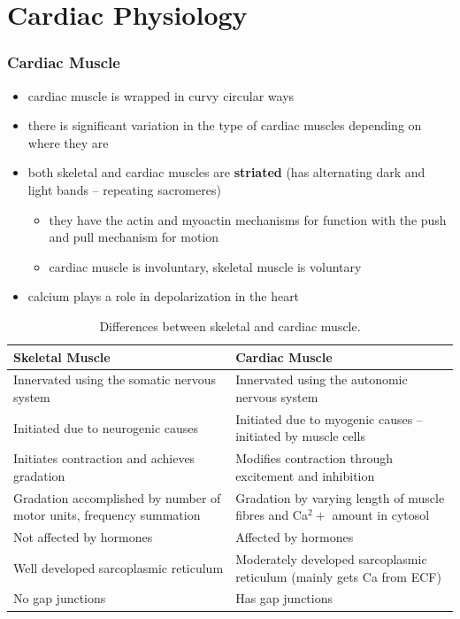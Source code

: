\documentclass[10pt]{article}
\begin{document}
\part{Cardiac Physiology}
\section{Cardiac Muscle}
\begin{itemize}
    \item cardiac muscle is wrapped in curvy circular ways
    \item there is significant variation in the type of cardiac muscles depending on where they are 
    \item both skeletal and cardiac muscles are \textbf{striated} (has alternating dark and light bands -- repeating sacromeres)
        \begin{itemize}
            \item they have the actin and myoactin mechanisms for function with the push and pull mechanism for motion
            \item cardiac muscle is involuntary, skeletal muscle is voluntary
        \end{itemize}
    \item calcium plays a role in depolarization in the heart
\end{itemize}
\begin{table} %
    \begin{center}
        \caption{Differences between skeletal and cardiac muscle.}
        \begin{tabular}{|p{7cm}|p{7cm}|} 
             \hline\hline
             \textbf{Skeletal Muscle}  & \textbf{Cardiac Muscle}  \\
             \hline
             Innervated using the somatic nervous system & Innervated using the autonomic nervous system \\
             \hline
             Initiated due to neurogenic causes & Initiated due to myogenic causes -- initiated by muscle cells \\
             \hline
             Initiates contraction and achieves gradation & Modifies contraction through excitement and inhibition \\
             \hline
             Gradation accomplished by number of motor units, frequency summation & Gradation by varying length of muscle fibres and Ca$^2+$ amount in cytosol \\ 
             \hline
             Not affected by hormones & Affected by hormones \\ 
             \hline
             Well developed sarcoplasmic reticulum & Moderately developed sarcoplasmic reticulum (mainly gets Ca from ECF)\\ 
             \hline 
             No gap junctions & Has gap junctions \\ 
             \hline\hline
        \end{tabular}
        \label{skeletalVsCardiacMuscle}
    \end{center}
\end{table}
\end{document}
